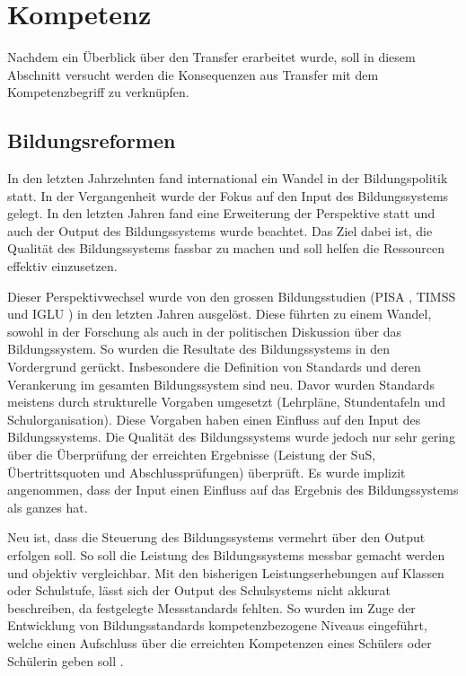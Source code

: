 \section{Kompetenz}

Nachdem ein Überblick über den Transfer erarbeitet wurde, soll in diesem Abschnitt versucht werden die Konsequenzen aus Transfer mit dem Kompetenzbegriff zu verknüpfen.

\subsection{Bildungsreformen}
In den letzten Jahrzehnten fand international ein Wandel in der Bildungspolitik statt. In der Vergangenheit wurde der Fokus auf den Input des Bildungssystems gelegt. In den letzten Jahren fand eine Erweiterung der Perspektive statt und auch der Output des Bildungssystems wurde beachtet. Das Ziel dabei ist, die Qualität des Bildungssystems fassbar zu machen und soll helfen die Ressourcen effektiv einzusetzen.

Dieser Perspektivwechsel wurde von den grossen Bildungsstudien (PISA \citep{PISA-KonsortiumDeuschland2004}, TIMSS \citep{Martin2003} und IGLU \citep{Bos2003}) in den letzten Jahren ausgelöst. Diese führten zu einem Wandel, sowohl in der Forschung als auch in der politischen Diskussion über das Bildungssystem. So wurden die Resultate des Bildungssystems in den Vordergrund gerückt. Insbesondere die Definition von Standards und deren Verankerung im gesamten Bildungssystem sind neu. Davor wurden Standards meistens durch strukturelle Vorgaben umgesetzt (Lehrpläne, Stundentafeln und Schulorganisation). Diese Vorgaben haben einen Einfluss auf den Input des Bildungssystems. Die Qualität des Bildungssystems wurde jedoch nur sehr gering über die Überprüfung der erreichten Ergebnisse (Leistung der SuS, Übertrittsquoten und Abschlussprüfungen) überprüft. Es wurde implizit angenommen, dass der Input einen Einfluss auf das Ergebnis des Bildungssystems als ganzes hat. 

Neu ist, dass die Steuerung des Bildungssystems vermehrt über den Output erfolgen soll. So soll die Leistung des Bildungssystems messbar gemacht werden und objektiv vergleichbar. Mit den bisherigen Leistungserhebungen auf Klassen oder Schulstufe, lässt sich der Output des Schulsystems nicht akkurat beschreiben, da festgelegte Messstandards fehlten. So wurden im Zuge der Entwicklung von Bildungsstandards kompetenzbezogene Niveaus eingeführt, welche einen Aufschluss über die erreichten Kompetenzen eines Schülers oder Schülerin geben soll \citep{Oelkers2008}.


